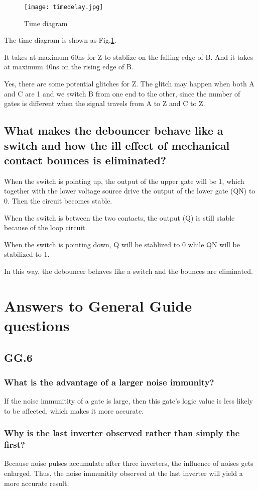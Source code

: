 \documentclass[11pt]{article}
\begin{document}
\begin{figure}[h]
    \centering
    \texttt{[image: timedelay.jpg]}
    \caption{Time diagram}
    \label{time_delay}
\end{figure}

The time diagram is shown as Fig.\ref{time_delay}.

It takes at maximum 60ns for Z to stablize on the falling edge of B. And it takes at maximum 40ns on the rising edge of B.

Yes, there are some potential glitches for Z. The glitch may happen when both A and C are 1 and we switch B from one end to the other, since the number of gates is different when the signal travels from A to Z and C to Z.

\subsection{What makes the debouncer behave like a switch and how the ill effect of mechanical contact bounces is eliminated?}
When the switch is pointing up, the output of the upper gate will be 1, which together with the lower voltage source drive the output of the lower gate (QN) to 0. Then the circuit becomes stable.

When the switch is between the two contacts, the output (Q) is still stable because of the loop circuit.

When the switch is pointing down, Q will be stablized to 0 while QN will be stabilized to 1. 

In this way, the debouncer behaves like a switch and the bounces are eliminated.

\section{Answers to General Guide questions}
\subsection{GG.6}
\subsubsection{What is the advantage of a larger noise immunity?}
If the noise immunitity of a gate is large, then this gate's logic value is less likely to be affected, which makes it more accurate.
\subsubsection{Why is the last inverter observed rather than simply the first?}
Because noise pulses accumulate after three inverters, the influence of noises gets enlarged. Thus, the noise immunitity observed at the last inverter will yield a more accurate result.
\end{document}
